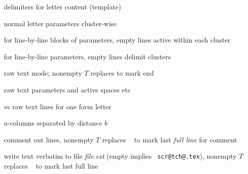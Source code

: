 {{%
\hruler


%
  {delimiters for letter content (template)}

%
  {normal letter parameters cluster-wise}


%
  {for line-by-line blocks of parameters, empty lines active
within each cluster}


%
  {for line-by-line parameters, empty lines delimit clusters}

\hruler

%
  {raw text mode; nonempty $T$ replaces {\tt\string\endrawblockmode}
   to mark end}


%
  {raw text parameters and active spaces etc}

%
  {$m$ raw text lines for one form letter}

\hruler

%
  {$a$-columns separated by distance $b$}


%
  {comment out lines, nonempty $T$ replaces {\tt
\string\endcomment} to mark last {\sl full line} for comment}


%
  {write text verbatim to file {\it file.ext} (empty implies {\tt
scr@tch@.tex}), nonempty $T$ replaces {\tt
\string\endfile} to mark last full line}



}}
